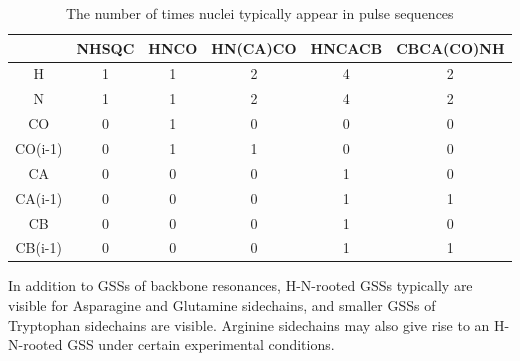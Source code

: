 \begin{table}
    \begin{tabular}{ | c || c | c | c | c | c |}
    \hline
              & NHSQC & HNCO & HN(CA)CO & HNCACB & CBCA(CO)NH \\
    \hline
      H       & 1 & 1 & 2 & 4 & 2 \\
    \hline
      N       & 1 & 1 & 2 & 4 & 2 \\
    \hline
      CO      & 0 & 1 & 0 & 0 & 0 \\
    \hline
      CO(i-1) & 0 & 1 & 1 & 0 & 0 \\
    \hline
      CA      & 0 & 0 & 0 & 1 & 0 \\
    \hline
      CA(i-1) & 0 & 0 & 0 & 1 & 1 \\
    \hline
      CB      & 0 & 0 & 0 & 1 & 0 \\
    \hline
      CB(i-1) & 0 & 0 & 0 & 1 & 1 \\
    \hline
    \end{tabular}
    \caption{The number of times nuclei typically appear in pulse sequences}
    \label{pulse_sequences}
\end{table}
	
In addition to GSSs of backbone resonances, H-N-rooted GSSs typically are 
visible for Asparagine and Glutamine sidechains, and smaller GSSs of 
Tryptophan sidechains are visible.  Arginine sidechains may also give rise 
to an H-N-rooted GSS under certain experimental conditions. 

